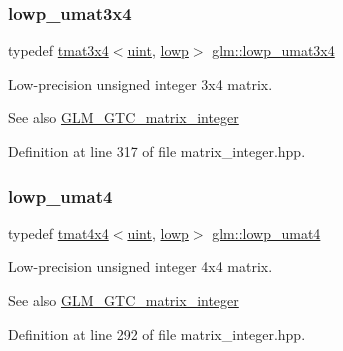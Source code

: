 \subsubsection{\texorpdfstring{lowp\_umat3x4}{lowp\_umat3x4}}
{\footnotesize\ttfamily typedef \mbox{\hyperlink{structglm_1_1tmat3x4}{tmat3x4}}$<$\mbox{\hyperlink{group__core__precision_ga4fd29415871152bfb5abd588334147c8}{uint}}, \mbox{\hyperlink{namespaceglm_a0f04f086094c747d227af4425893f545ae161af3fc695e696ce3bf69f7332bc2d}{lowp}}$>$ \mbox{\hyperlink{group__gtc__matrix__integer_ga2ed807c71afb8c0f8742bb03e9f71829}{glm\+::lowp\+\_\+umat3x4}}}

Low-\/precision unsigned integer 3x4 matrix. \begin{DoxySeeAlso}{See also}
\mbox{\hyperlink{group__gtc__matrix__integer}{G\+L\+M\+\_\+\+G\+T\+C\+\_\+matrix\+\_\+integer}} 
\end{DoxySeeAlso}


Definition at line 317 of file matrix\+\_\+integer.\+hpp.

\mbox{\label{group__gtc__matrix__integer_gaa430d894a3290d551061d0d77c017cec}} 
\subsubsection{\texorpdfstring{lowp\_umat4}{lowp\_umat4}}
{\footnotesize\ttfamily typedef \mbox{\hyperlink{structglm_1_1tmat4x4}{tmat4x4}}$<$\mbox{\hyperlink{group__core__precision_ga4fd29415871152bfb5abd588334147c8}{uint}}, \mbox{\hyperlink{namespaceglm_a0f04f086094c747d227af4425893f545ae161af3fc695e696ce3bf69f7332bc2d}{lowp}}$>$ \mbox{\hyperlink{group__gtc__matrix__integer_gaa430d894a3290d551061d0d77c017cec}{glm\+::lowp\+\_\+umat4}}}

Low-\/precision unsigned integer 4x4 matrix. \begin{DoxySeeAlso}{See also}
\mbox{\hyperlink{group__gtc__matrix__integer}{G\+L\+M\+\_\+\+G\+T\+C\+\_\+matrix\+\_\+integer}} 
\end{DoxySeeAlso}


Definition at line 292 of file matrix\+\_\+integer.\+hpp.

\mbox{\label{group__gtc__matrix__integer_ga5f4e6bb892b20b532bd9caa9aee120b9}} 
